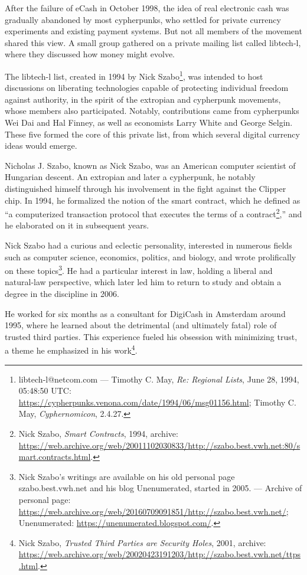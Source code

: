 \documentclass[
  a5paper,
  smalldemyvopaper,10pt,twoside,onecolumn,openright,extrafontsizes,hidelinks]{memoir}
\begin{document}

After the failure of eCash in October 1998, the idea of real electronic
cash was gradually abandoned by most cypherpunks, who settled for
private currency experiments and existing payment systems. But not all
members of the movement shared this view. A small group gathered on a
private mailing list called libtech-l, where they discussed how money
might evolve.

The libtech-l list, created in 1994 by Nick Szabo\footnote{libtech-l@netcom.com
  --- Timothy C. May, \emph{Re: Regional Lists}, June 28, 1994, 05:48:50
  UTC: \url{https://cypherpunks.venona.com/date/1994/06/msg01156.html};
  Timothy C. May, \emph{Cyphernomicon}, 2.4.27.}, was intended to host
discussions on liberating technologies capable of protecting individual
freedom against authority, in the spirit of the extropian and cypherpunk
movements, whose members also participated. Notably, contributions came
from cypherpunks Wei Dai and Hal Finney, as well as economists Larry
White and George Selgin. These five formed the core of this private
list, from which several digital currency ideas would emerge.

Nicholas J. Szabo, known as Nick Szabo, was an American computer
scientist of Hungarian descent. An extropian and later a cypherpunk, he
notably distinguished himself through his involvement in the fight
against the Clipper chip. In 1994, he formalized the notion of the smart
contract, which he defined as ``a computerized transaction protocol that
executes the terms of a contract\footnote{Nick Szabo, \emph{Smart
  Contracts}, 1994, archive:
  \url{https://web.archive.org/web/20011102030833/http://szabo.best.vwh.net:80/smart.contracts.html}.},''
and he elaborated on it in subsequent years.

Nick Szabo had a curious and eclectic personality, interested in
numerous fields such as computer science, economics, politics, and
biology, and wrote prolifically on these topics\footnote{Nick Szabo's
  writings are available on his old personal page szabo.best.vwh.net and
  his blog Unenumerated, started in 2005. --- Archive of personal page:
  \url{https://web.archive.org/web/20160709091851/http://szabo.best.vwh.net/};
  Unenumerated: \url{https://unenumerated.blogspot.com/}.}. He had a
particular interest in law, holding a liberal and natural-law
perspective, which later led him to return to study and obtain a degree
in the discipline in 2006.

He worked for six months as a consultant for DigiCash in Amsterdam
around 1995, where he learned about the detrimental (and ultimately
fatal) role of trusted third parties. This experience fueled his
obsession with minimizing trust, a theme he emphasized in his
work\footnote{Nick Szabo, \emph{Trusted Third Parties are Security
  Holes}, 2001, archive:
  \url{https://web.archive.org/web/20020423191203/http://szabo.best.vwh.net/ttps.html}.}.
\end{document}
